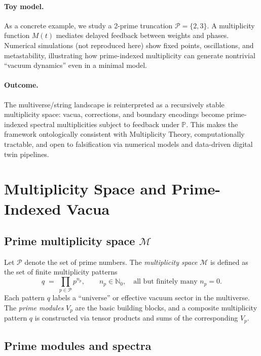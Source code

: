 \documentclass[11pt]{article}
\begin{document}
\paragraph{Toy model.}
As a concrete example, we study a 2-prime truncation \(\mathcal{P} = \{2,3\}\).
A multiplicity function \(M(t)\) mediates delayed feedback between weights and phases.
Numerical simulations (not reproduced here) show fixed points, oscillations, and metastability, illustrating how prime-indexed multiplicity can generate nontrivial ``vacuum dynamics'' even in a minimal model.

\paragraph{Outcome.}
The multiverse/string landscape is reinterpreted as a recursively stable multiplicity space: vacua, corrections, and boundary encodings become prime-indexed spectral multiplicities subject to feedback under \(\mathbb{P}\).
This makes the framework ontologically consistent with Multiplicity Theory, computationally tractable, and open to falsification via numerical models and data-driven digital twin pipelines.

\tableofcontents

\section{Multiplicity Space and Prime-Indexed Vacua}

\subsection{Prime multiplicity space \texorpdfstring{\(\mathcal{M}\)}{M}}

Let \(\mathcal{P}\) denote the set of prime numbers.
The \emph{multiplicity space} \(\mathcal{M}\) is defined as the set of finite multiplicity patterns
\begin{equation}
  q \;=\; \prod_{p \in \mathcal{P}} p^{n_p},
  \qquad n_p \in \mathbb{N}_0, \quad \text{all but finitely many } n_p = 0.
\end{equation}
Each pattern \(q\) labels a ``universe'' or effective vacuum sector in the multiverse.
The \emph{prime modules} \(V_p\) are the basic building blocks, and a composite multiplicity pattern \(q\) is constructed via tensor products and sums of the corresponding \(V_p\).

\subsection{Prime modules and spectra}
\end{document}
